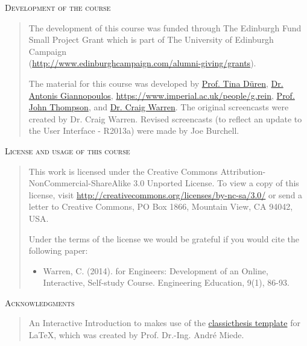 \nocite{Pratap:2006fk} 
\nocite{Magrab:2005fk}
\nocite{Moore:2009fk}

\newpage
\textsc{Development of the course}
\begin{quote}
The development of this course was funded through The Edinburgh Fund Small Project Grant which is part of The University of Edinburgh Campaign \\ (\href{http://www.edinburghcampaign.com/alumni-giving/grants}{http://www.edinburghcampaign.com/alumni-giving/grants}).

The material for this course was developed by \href{http://www.bath.ac.uk/chem-eng/people/duren/}{Prof. Tina D\"uren}, \href{https://www.eng.ed.ac.uk/about/people/dr-antonis-giannopoulos}{Dr. Antonis Giannopoulos}, \href{Prof. Guillermo Rein}{https://www.imperial.ac.uk/people/g.rein}, \href{https://www.eng.ed.ac.uk/about/people/prof-john-thompson}{Prof. John Thompson}, and \href{https://www.northumbria.ac.uk/about-us/our-staff/w/craig-warren/}{Dr. Craig Warren}. The original screencasts were created by Dr. Craig Warren. Revised screencasts (to reflect an update to the \mlab User Interface - \mlab R2013a) were made by Joe Burchell.
\end{quote}

\textsc{License and usage of this course}
\begin{quote}
This work is licensed under the Creative Commons Attribution-NonCommercial-ShareAlike 3.0 Unported License. To view a copy of this license, visit \href{http://creativecommons.org/licenses/by-nc-sa/3.0/ <http://creativecommons.org/licenses/by-nc-sa/3.0/}{http://creativecommons.org/licenses/by-nc-sa/3.0/} or send a letter to Creative Commons, PO Box 1866, Mountain View, CA 94042, USA.

Under the terms of the license we would be grateful if you would cite the following paper:
\begin{itemize}
\item Warren, C. (2014). \mlab for Engineers: Development of an Online, Interactive, Self-study Course. Engineering Education, 9(1), 86-93. 
\end{itemize}
\end{quote}

\textsc{Acknowledgments}
\begin{quote}
An Interactive Introduction to \mlab makes use of the \href{http://www.miede.de/#classicthesis}{classicthesis template} for LaTeX, which was created by Prof. Dr.-Ing. Andr\'{e} Miede.
\end{quote}

\endgroup